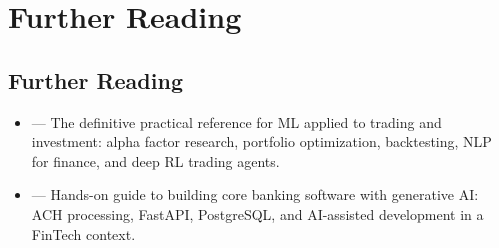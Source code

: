\section{Further Reading}

\subsection*{Further Reading}

\begin{tcbitemize}[ skin=sectionraster ]

    \tcbitem[title=Further Reading, raster multicolumn=6]
    \begin{itemize}
        \item {} --- The definitive practical reference for ML applied to trading and investment: alpha factor research, portfolio optimization, backtesting, NLP for finance, and deep RL trading agents.
        \item {} --- Hands-on guide to building core banking software with generative AI: ACH processing, FastAPI, PostgreSQL, and AI-assisted development in a FinTech context.
    \end{itemize}

\end{tcbitemize}
